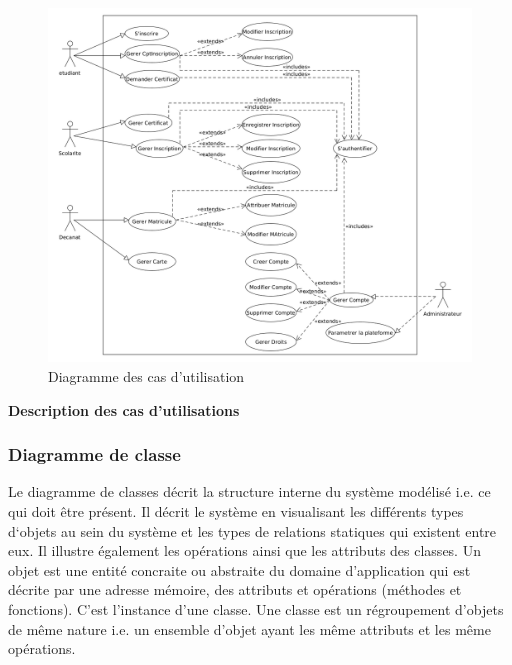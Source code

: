 \documentclass[12pt,a4paper]{article}
\begin{document}
	\begin{figure}[H]
		\centering
		\includegraphics[width=12.5cm]{use_case_diag}
		\caption{Diagramme des cas d'utilisation}
		\label{fig:figure3}
	\end{figure}

	\textbf{Description des cas d'utilisations}

	\subsubsection{Diagramme de classe}
	Le diagramme de classes décrit la structure interne du système
	modélisé i.e. ce qui doit être présent. Il décrit le système en
	visualisant les différents types d‘objets au sein du système et
	les types de relations statiques qui existent entre eux. Il illustre
	également les opérations ainsi que les attributs des classes. Un objet est une entité concraite ou abstraite du domaine
	d’application qui est décrite par une adresse mémoire, des
	attributs et opérations (méthodes et fonctions). C’est
	l’instance d’une classe. Une classe est un régroupement d’objets de même nature i.e.	un ensemble d’objet ayant les même attributs et les même
	opérations.
	
\end{document}
